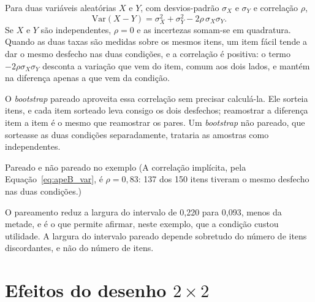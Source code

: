 Para duas variáveis aleatórias $X$ e $Y$, com desvios-padrão $\sigma_X$ e
$\sigma_Y$ e correlação $\rho$,
\begin{equation}
\mathrm{Var}(X - Y) = \sigma_X^2 + \sigma_Y^2 - 2\rho\,\sigma_X\sigma_Y.
\label{eq:apeB_var}
\end{equation}
Se $X$ e $Y$ são independentes, $\rho = 0$ e as incertezas somam-se em
quadratura. Quando as duas taxas são medidas sobre os mesmos itens, um item
fácil tende a dar o mesmo desfecho nas duas condições, e a correlação é
positiva: o termo $-2\rho\sigma_X\sigma_Y$ desconta a variação que vem do
item, comum aos dois lados, e mantém na diferença apenas a que vem da
condição.

O \textit{bootstrap} pareado aproveita essa correlação sem precisar
calculá-la. Ele sorteia itens, e cada item sorteado leva consigo os dois
desfechos; reamostrar a diferença item a item é o mesmo que reamostrar os
pares. Um \textit{bootstrap} não pareado, que sorteasse as duas condições
separadamente, trataria as amostras como independentes.

\begin{bloco}{Pareado e não pareado no exemplo}
(A correlação implícita, pela Equação~\eqref{eq:apeB_var}, é $\rho = 0{,}83$:
137 dos 150 itens tiveram o mesmo desfecho nas duas condições.)


\end{bloco}

O pareamento reduz a largura do intervalo de 0,220 para 0,093, menos da
metade, e é o que permite afirmar, neste exemplo, que a condição custou
utilidade. A largura do intervalo pareado depende sobretudo do número de
itens discordantes, e não do número de itens.

\section{Efeitos do desenho \texorpdfstring{$2 \times 2$}{2×2}}\label{sec:apeB_efeitos}


